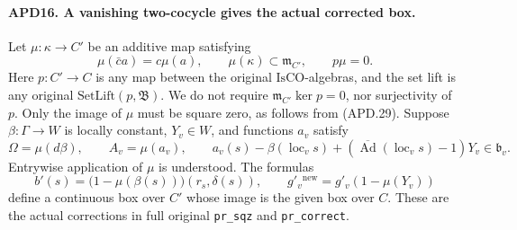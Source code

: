 \documentclass[11pt,a4paper]{article}
\numberwithin{equation}{section}
\theoremstyle{remark}\newtheorem{remark}[theorem]{Remark}
\begin{document}
\paragraph{APD16. A vanishing two-cocycle gives the actual corrected box.}
\label{claim:APD16}
Let \(\mu:\kappa\to C'\) be an additive map satisfying
\[
 \mu(\bar c a)=c\mu(a),\qquad
 \mu(\kappa)\subset\mathfrak m_{C'},\qquad p\mu=0.
                                                               \tag{APD.29}
\]
Here \(p:C'\to C\) is any map between the original
\(\mathrm{IsCO}\)-algebras, and the set lift is any original
\(\mathrm{SetLift}(p,\mathfrak B)\).  We do not require
\(\mathfrak m_{C'}\ker p=0\), nor surjectivity of \(p\).
Only the image of \(\mu\) must be square zero, as follows
from (APD.29).  Suppose \(\beta:\Gamma\to W\)
is locally constant, \(Y_v\in W\), and functions \(a_v\)
satisfy
\[
 \Omega=\mu(d\beta),\qquad A_v=\mu(a_v),\qquad
 a_v(s)-\beta(\operatorname{loc}_v s)
       +(\overline{\operatorname{Ad}}(\operatorname{loc}_v s)-1)Y_v
                                                        \in\mathfrak b_v.
                                                               \tag{APD.30}
\]
Entrywise application of \(\mu\) is understood.  The formulas
\[
 b'(s)=\bigl(1-\mu(\beta(s))\bigr)(r_s,\delta(s)),
 \qquad g'_v{}^{\mathrm{new}}=g'_v(1-\mu(Y_v))             \tag{APD.31}
\]
define a continuous box over \(C'\) whose image is the given box
over \(C\).  These are the actual corrections in full original
\texttt{pr\_\allowbreak sqz} and \texttt{pr\_\allowbreak correct}.
\end{document}
